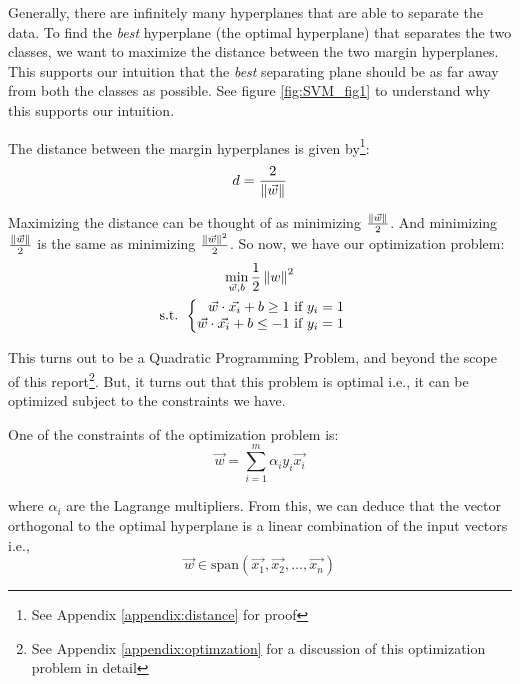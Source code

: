 Generally, there are infinitely many hyperplanes that are able to separate the data. To find the \textit{best} hyperplane (the optimal hyperplane) that separates the two classes, we want to maximize the distance between the two margin hyperplanes. This supports our intuition that the \textit{best} separating plane should be as far away from both the classes as possible. See figure \ref{fig:SVM_fig1} to understand why this supports our intuition.

The distance between the margin hyperplanes is given by\footnote{See Appendix \ref{appendix:distance} for proof}:
\begin{equation}
d = \frac{2}{\left\lVert\vec{w}\right\rVert} \label{eq:margin-dist}
\end{equation}

Maximizing the distance can be thought of as minimizing $\frac{\left\lVert\vec{w}\right\rVert}{2}$. And minimizing $\frac{\left\lVert\vec{w}\right\rVert}{2}$ is the same as minimizing $\frac{\left\lVert\vec{w}\right\rVert^2}{2}$. So now, we have our optimization problem:
\begin{gather}
	\min_{\vec{w}, b} \frac{1}{2}\left\lVert w\right\rVert^2 \nonumber\\
	\text{s.t. }
	\begin{cases}
	\begin{aligned}
		\vec{w}\cdot\vec{x_i} + b \geq 1 \text{ if $y_i = 1$} \nonumber\\
		\vec{w}\cdot\vec{x_i} + b \leq -1 \text{ if $y_i = 1$} \nonumber
	\end{aligned}
	\end{cases}
\end{gather}

This turns out to be a Quadratic Programming Problem, and beyond the scope of this report\footnote{See Appendix \ref{appendix:optimzation} for a discussion of this optimization problem in detail}. But, it turns out that this problem is optimal i.e., it can be optimized subject to the constraints we have.

One of the constraints of the optimization problem is:
\begin{equation}
\vec{w} = \sum_{i = 1}^{m}\alpha_{i}y_{i}\vec{x_i} \label{eq:w-and-x}
\end{equation}

where $\alpha_{i}$ are the Lagrange multipliers. From this, we can deduce that the vector orthogonal to the optimal hyperplane is a linear combination of the input vectors i.e.,
\begin{equation*}
	\vec{w} \in \text{span}(\vec{x_1}, \vec{x_2}, \dots, \vec{x_n})
\end{equation*}

